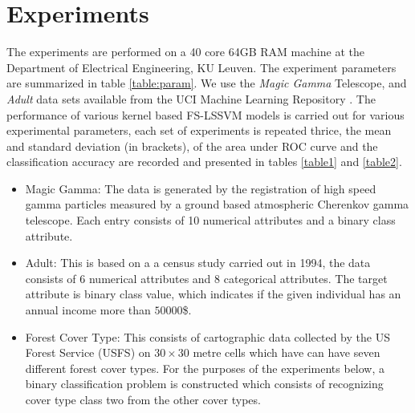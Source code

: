 \chapter{Experiments}
\label{cha:n}
The experiments are performed on a 40 core 64GB RAM machine at the Department of Electrical Engineering, KU Leuven. The experiment parameters are summarized in table \ref{table:param}. We use the \textit{Magic Gamma} Telescope, and \textit{Adult} data sets available from the UCI Machine Learning Repository \cite{Lichman:2013}. The performance of various kernel based FS-LSSVM models is carried out for various experimental parameters, each set of experiments is repeated thrice, the mean and standard deviation (in brackets), of the area under ROC curve and the classification accuracy are recorded and presented in tables \ref{table1} and \ref{table2}.

\begin{itemize}
\item Magic Gamma: The data is generated by the registration of high speed gamma particles measured by a ground based atmospheric Cherenkov gamma telescope. Each entry consists of 10 numerical attributes and a binary class attribute. 
\item Adult: This is based on a a census study carried out in 1994, the data consists of 6 numerical attributes and 8 categorical attributes. The target attribute is binary class value, which indicates if the given individual has an annual income more than $50 000$\$.
\item Forest Cover Type: This consists of cartographic data collected by the US Forest Service (USFS) on $30 \times 30$ metre cells which have can have seven different forest cover types. For the purposes of the experiments below, a binary classification problem is constructed which consists of recognizing cover type class two from the other cover types. 
\end{itemize}

\begin{table*}[!htbp]
\caption{Experiment Parameters}
\label{table:param}
\centering
{}
\end{table*}

